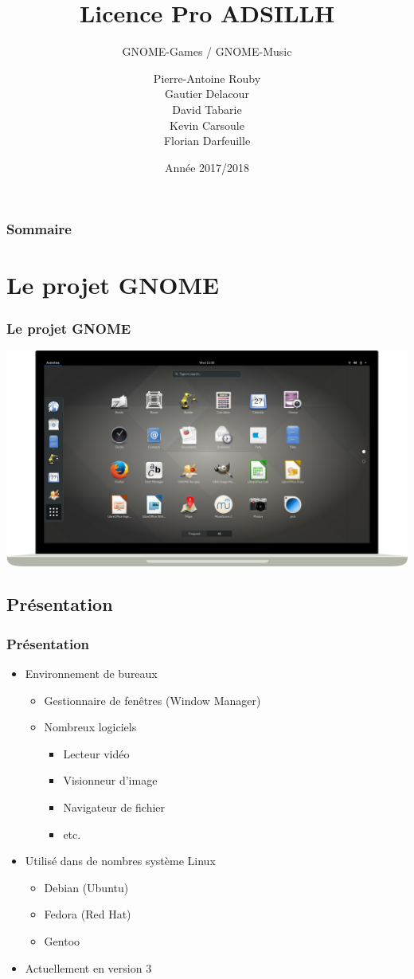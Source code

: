 \documentclass{beamer}
\title{Licence Pro ADSILLH}
\subtitle{GNOME-Games / GNOME-Music}
\author{Pierre-Antoine Rouby\\Gautier Delacour\\
  David Tabarie\\Kevin Carsoule\\Florian Darfeuille}
\date{Année 2017/2018}
\begin{document}
\frame{\titlepage}

\begin{frame}
  \frametitle{Sommaire}
  \tableofcontents
\end{frame}

\section{Le projet GNOME}
\begin{frame}
  \frametitle{Le projet GNOME}
  \includegraphics[scale=0.2]{images/GnomeScreen.png}
\end{frame}

\subsection{Présentation}
\begin{frame}
  \frametitle{Présentation}
  \begin{itemize}
  \item Environnement de bureaux \pause
    \begin{itemize}
    \item Gestionnaire de fenêtres (Window Manager) \pause
    \item Nombreux logiciels \pause
      \begin{itemize} %
      \item Lecteur vidéo
      \item Visionneur d'image
      \item Navigateur de fichier
      \item etc. \pause
      \end{itemize}
    \end{itemize}
  \item Utilisé dans de nombres système Linux \pause
    \begin{itemize}
    \item Debian (Ubuntu)
    \item Fedora (Red Hat)
    \item Gentoo \pause
    \end{itemize}
  \item Actuellement en version 3
  \end{itemize}
\end{frame}
\end{document}
